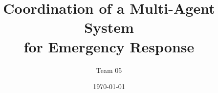 \title{Coordination of a Multi-Agent System \\for Emergency Response}
\author{Team 05}
\date{\today}

\begin{frame}
    \titlepage
\end{frame}
